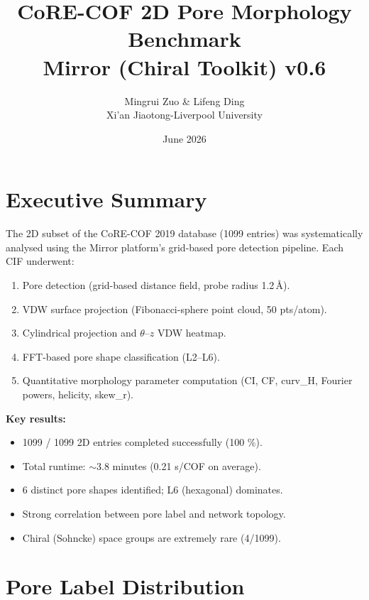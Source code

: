 \documentclass[11pt,a4paper]{article}
\title{\textbf{CoRE-COF 2D Pore Morphology Benchmark}\\Mirror (Chiral Toolkit) v0.6}
\author{Mingrui Zuo \& Lifeng Ding\\Xi'an Jiaotong-Liverpool University}
\date{June 2026}
\begin{document}
\maketitle
\tableofcontents
\newpage

\section{Executive Summary}

The 2D subset of the CoRE-COF 2019 database (1099 entries) was
systematically analysed using the Mirror platform's grid-based pore
detection pipeline.  Each CIF underwent:

\begin{enumerate}
    \item Pore detection (grid-based distance field, probe radius 1.2\,\AA).
    \item VDW surface projection (Fibonacci-sphere point cloud, 50 pts/atom).
    \item Cylindrical projection and $\theta$--$z$ VDW heatmap.
    \item FFT-based pore shape classification (L2--L6).
    \item Quantitative morphology parameter computation (CI, CF,
          curv\_H, Fourier powers, helicity, skew\_r).
\end{enumerate}

\textbf{Key results:}
\begin{itemize}
    \item 1099 / 1099 2D entries completed successfully (100 \%).
    \item Total runtime: $\sim$3.8 minutes (0.21 s/COF on average).
    \item 6 distinct pore shapes identified; L6 (hexagonal) dominates.
    \item Strong correlation between pore label and network topology.
    \item Chiral (Sohncke) space groups are extremely rare (4/1099).
\end{itemize}

\section{Pore Label Distribution}
\end{document}
